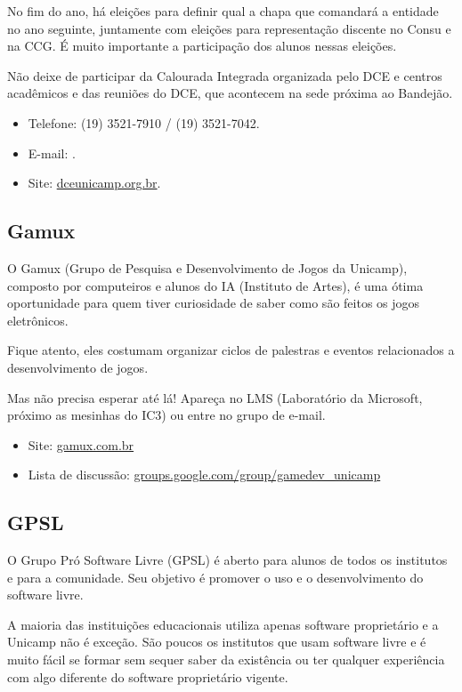 No fim do ano, há eleições para definir qual
a chapa que comandará a entidade no ano seguinte, juntamente com eleições para
representação discente no Consu e na CCG. É muito importante a participação dos
alunos nessas eleições.

Não deixe de participar da Calourada Integrada organizada pelo DCE e centros
acadêmicos e das reuniões do DCE, que acontecem na sede próxima ao Bandejão.

\begin{itemize}
\item  Telefone: (19) 3521-7910 / (19) 3521-7042.
\item  E-mail: .
\item  Site: \url{dceunicamp.org.br}.
\end{itemize}

\subsection{Gamux}

O Gamux (Grupo de Pesquisa e Desenvolvimento de Jogos da Unicamp), composto por
computeiros e alunos do IA (Instituto de Artes), é uma ótima oportunidade para
quem tiver curiosidade de saber como são feitos os jogos eletrônicos.

Fique atento, eles costumam organizar ciclos de palestras e eventos relacionados
a desenvolvimento de jogos.

Mas não precisa esperar até lá! Apareça no LMS (Laboratório da Microsoft,
próximo as mesinhas do IC3) ou entre no grupo de e-mail.

\begin{itemize}
\item  Site: \url{gamux.com.br}
\item  Lista de discussão: \url{groups.google.com/group/gamedev_unicamp}
\end{itemize}

\subsection{GPSL}

O Grupo Pró Software Livre (GPSL) é aberto para alunos de todos os institutos
e para a comunidade. Seu objetivo é promover o uso e o desenvolvimento do
software livre.

A maioria das instituições educacionais utiliza apenas software
proprietário e a Unicamp não é exceção. São poucos os institutos que usam
software livre e é muito fácil se formar sem sequer saber da existência ou ter
qualquer experiência com algo diferente do software proprietário vigente.

